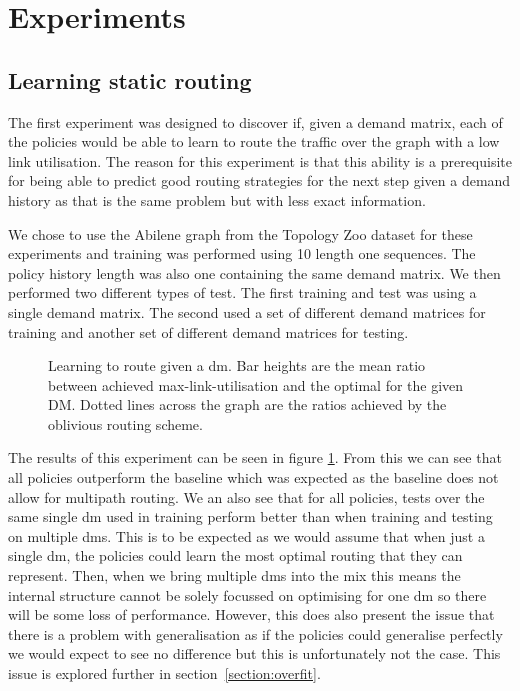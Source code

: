 \section{Experiments}

\subsection{Learning static routing}
\label{section:exp_static}
The first experiment was designed to discover if, given a demand matrix, each of the policies would be able to learn to route the traffic over the graph with a low link utilisation. The reason for this experiment is that this ability is a prerequisite for being able to predict good routing strategies for the next step given a demand history as that is the same problem but with less exact information.

We chose to use the Abilene graph from the Topology Zoo dataset for these experiments and training was performed using 10 length one sequences. The policy history length was also one containing the same demand matrix. We then performed two different types of test. The first training and test was using a single demand matrix. The second used a set of different demand matrices for training and another set of different demand matrices for testing.

\begin{figure}
    \centering
    
    \caption{Learning to route given a \ac{dm}. Bar heights are the mean ratio between achieved max-link-utilisation and the optimal for the given DM. Dotted lines across the graph are the ratios achieved by the oblivious routing scheme.}
    \label{fig:exp_static}
\end{figure}

The results of this experiment can be seen in figure \ref{fig:exp_static}. From this we can see that all policies outperform the baseline which was expected as the baseline does not allow for multipath routing. We an also see that for all policies, tests over the same single \ac{dm} used in training perform better than when training and testing on multiple \acp{dm}. This is to be expected as we would assume that when just a single \ac{dm}, the policies could learn the most optimal routing that they can represent. Then, when we bring multiple \acp{dm} into the mix this means the internal structure cannot be solely focussed on optimising for one \ac{dm} so there will be some loss of performance. However, this does also present the issue that there is a problem with generalisation as if the policies could generalise perfectly we would expect to see no difference but this is unfortunately not the case. This issue is explored further in section~\ref{section:overfit}.


